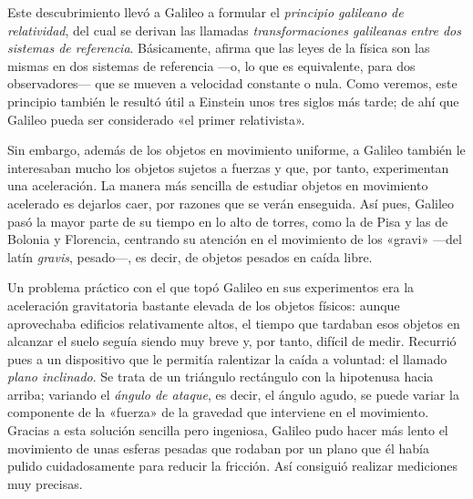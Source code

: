 Este descubrimiento llevó a Galileo a formular el \emph{principio galileano de
relatividad}, del cual se derivan las llamadas
\emph{transformaciones galileanas} \emph{entre dos
sistemas de referencia}. Básicamente, afirma que las leyes de la física son las
mismas en dos sistemas de referencia ---o, lo que es equivalente, para dos
observadores--- que se mueven a velocidad constante o nula. Como veremos, este
principio también le resultó útil a Einstein unos tres siglos más tarde; de ahí
que Galileo pueda ser considerado «el primer relativista».

Sin embargo, además de los objetos en movimiento uniforme, a Galileo también le
interesaban mucho los objetos sujetos a fuerzas y que, por tanto, experimentan una
aceleración. La manera más sencilla de estudiar objetos en movimiento acelerado es
dejarlos caer, por razones que se verán enseguida. Así pues, Galileo pasó la mayor
parte de su tiempo en lo alto de torres, como la de Pisa y las de Bolonia y Florencia,
centrando su atención en el movimiento de los «gravi»
---del latín \emph{gravis}, pesado---, es decir, de objetos pesados en caída
libre.

Un problema práctico con el que topó Galileo en sus experimentos era la aceleración
gravitatoria bastante elevada de los objetos físicos: aunque aprovechaba edificios
relativamente altos, el tiempo que tardaban esos objetos en alcanzar el suelo seguía
siendo muy breve y, por tanto, difícil de medir. Recurrió pues a un dispositivo que
le permitía ralentizar la caída a voluntad: el llamado \emph{plano inclinado}.
Se trata de un triángulo rectángulo con la hipotenusa hacia arriba; variando el
\emph{ángulo de ataque}, es decir, el ángulo agudo, se puede variar la componente
de la «fuerza» de la gravedad que interviene en el
movimiento. Gracias a esta solución sencilla pero ingeniosa, Galileo pudo hacer
más lento el movimiento de unas esferas pesadas que rodaban por un plano que él
había pulido cuidadosamente para reducir la fricción. Así consiguió realizar
mediciones muy precisas.

